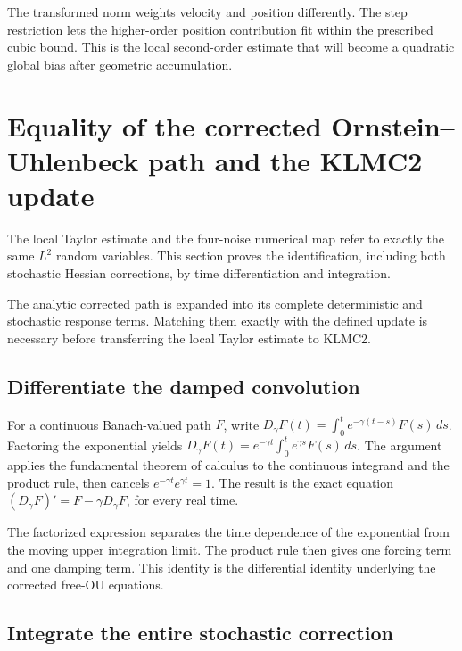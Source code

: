 \documentclass[11pt,a4paper]{report}
\begin{document}
The transformed norm weights velocity and position differently. The step restriction lets the higher-order position contribution fit within the prescribed cubic bound. This is the local second-order estimate that will become a quadratic global bias after geometric accumulation.

\section{\texorpdfstring{Equality of the corrected Ornstein–Uhlenbeck path and the KLMC2 update}{Equality of the corrected Ornstein–Uhlenbeck path and the KLMC2 update}}
\label{proof-module-KineticLangevin-CorrectedStep-lean}


The local Taylor estimate and the four-noise numerical map refer to exactly the same \(L^{2}\) random variables. This section proves the identification, including both stochastic Hessian corrections, by time differentiation and integration.



The analytic corrected path is expanded into its complete deterministic and stochastic response terms. Matching them exactly with the defined update is necessary before transferring the local Taylor estimate to KLMC2.

\subsection{\texorpdfstring{Differentiate the damped convolution}{Differentiate the damped convolution}}
\label{report-step-KineticLangevin-CorrectedStep-lean-1}


For a continuous Banach-valued path \(F\), write \(D_\gamma F(t)=\int_0^te^{-\gamma(t-s)}F(s)\,ds\). Factoring the exponential yields \(D_\gamma F(t)=e^{-\gamma t}\int_0^te^{\gamma s}F(s)\,ds\). The argument applies the fundamental theorem of calculus to the continuous integrand and the product rule, then cancels \(e^{-\gamma t}e^{\gamma t}=1\). The result is the exact equation \((D_\gamma F)\prime=F-\gamma D_\gamma F\), for every real time.



The factorized expression separates the time dependence of the exponential from the moving upper integration limit. The product rule then gives one forcing term and one damping term. This identity is the differential identity underlying the corrected free-OU equations.

\subsection{\texorpdfstring{Integrate the entire stochastic correction}{Integrate the entire stochastic correction}}
\label{report-step-KineticLangevin-CorrectedStep-lean-2}
\end{document}
